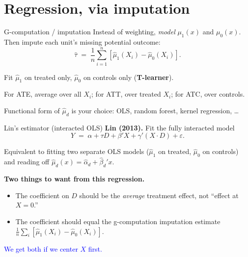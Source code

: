 \documentclass[xcolor=dvipsnames]{beamer}
\begin{document}
\section{Regression, via imputation}

\begin{frame}{G-computation / imputation}
\small
{} Instead of weighting, \textit{model} $\mu_1(x)$ and $\mu_0(x)$. Then impute each unit's missing potential outcome:
$$\widehat{\tau} \;=\; \frac{1}{n}\sum_{i=1}^n\!\left[\widehat{\mu}_1(X_i) - \widehat{\mu}_0(X_i)\right].$$

\medskip
{} Fit $\widehat{\mu}_1$ on treated only, $\widehat{\mu}_0$ on controls only (\textbf{T-learner}).

\medskip
{} For ATE, average over all $X_i$; for ATT, over treated $X_i$; for ATC, over controls.

\medskip
{} Functional form of $\widehat\mu_d$ is your choice: OLS, random forest, kernel regression, \ldots
\end{frame}







\begin{frame}{Lin's estimator (interacted OLS)}
\small
{} \textbf{Lin (2013).} Fit the fully interacted model
$$Y \;=\; \alpha + \tau D + \beta' X + \gamma'(X \cdot D) + \varepsilon.$$

\medskip
{} Equivalent to fitting two separate OLS models ($\widehat{\mu}_1$ on treated, $\widehat{\mu}_0$ on controls) and reading off $\widehat\mu_d(x) = \widehat\alpha_d + \widehat\beta_d' x$.

\medskip
{} \textbf{Two things to want from this regression.}
\begin{itemize}
\item The coefficient on $D$ should be the \textit{average} treatment effect, not ``effect at $X=0$.''
\item The coefficient should equal the g-computation imputation estimate $\tfrac{1}{n}\sum_i[\widehat{\mu}_1(X_i) - \widehat{\mu}_0(X_i)]$.
\end{itemize}

\medskip
{} \textcolor{Blue}{We get both if we center $X$ first.}
\end{frame}
\end{document}
